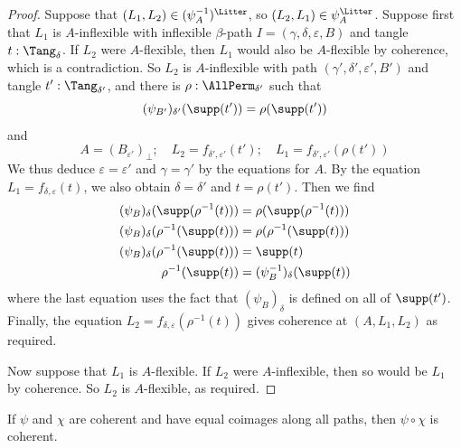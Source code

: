 \begin{proof}
  Suppose that \( (L_1, L_2) \in (\psi^{-1}_A)^\Litter \), so \( (L_2, L_1) \in \psi_A^\Litter \).
  Suppose first that \( L_1 \) is \( A \)-inflexible with inflexible \( \beta \)-path \( I = (\gamma, \delta, \varepsilon, B) \) and tangle \( t : \Tang_\delta \).
  If \( L_2 \) were \( A \)-flexible, then \( L_1 \) would also be \( A \)-flexible by coherence, which is a contradiction.
  So \( L_2 \) is \( A \)-inflexible with path \( (\gamma', \delta', \varepsilon', B') \) and tangle \( t' : \Tang_{\delta'} \), and there is \( \rho : \AllPerm_{\delta'} \) such that
  \[ (\psi_{B'})_{\delta'}(\supp(t')) = \rho(\supp(t')) \]
  and
  \[ A = (B_{\varepsilon'})_\bot;\quad L_2 = f_{\delta',\varepsilon'}(t');\quad L_1 = f_{\delta',\varepsilon'}(\rho(t')) \]
  We thus deduce \( \varepsilon = \varepsilon' \) and \( \gamma = \gamma' \) by the equations for \( A \).
  By the equation \( L_1 = f_{\delta,\varepsilon}(t) \), we also obtain \( \delta = \delta' \) and \( t = \rho(t') \).
  Then we find
  \begin{align*}
    (\psi_B)_\delta(\supp(\rho^{-1}(t))) &= \rho(\supp(\rho^{-1}(t))) \\
    (\psi_B)_\delta(\rho^{-1}(\supp(t))) &= \rho(\rho^{-1}(\supp(t))) \\
    (\psi_B)_\delta(\rho^{-1}(\supp(t))) &= \supp(t) \\
    \rho^{-1}(\supp(t)) &= (\psi^{-1}_B)_\delta(\supp(t))
  \end{align*}
  where the last equation uses the fact that \( (\psi_B)_\delta \) is defined on all of \( \supp(t') \).
  Finally, the equation \( L_2 = f_{\delta,\varepsilon}(\rho^{-1}(t)) \) gives coherence at \( (A, L_1, L_2) \) as required.

  Now suppose that \( L_1 \) is \( A \)-flexible.
  If \( L_2 \) were \( A \)-inflexible, then so would be \( L_1 \) by coherence.
  So \( L_2 \) is \( A \)-flexible, as required.
\end{proof}
\begin{proposition}
  \label{prop:StrApprox.Coherent.comp}
  If \( \psi \) and \( \chi \) are coherent and have equal coimages along all paths, then \( \psi \circ \chi \) is coherent.
\end{proposition}
